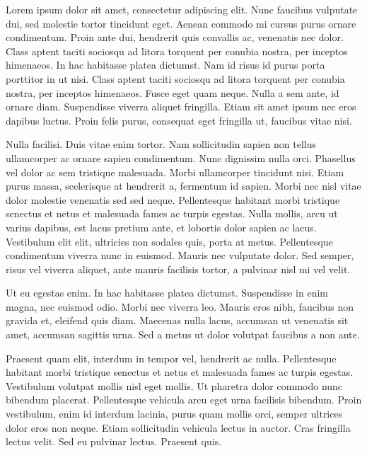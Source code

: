 Lorem ipsum dolor sit amet, consectetur adipiscing elit. Nunc faucibus vulputate dui, sed molestie tortor tincidunt eget. Aenean commodo mi cursus purus ornare condimentum. Proin ante dui, hendrerit quis convallis ac, venenatis nec dolor. Class aptent taciti sociosqu ad litora torquent per conubia nostra, per inceptos himenaeos. In hac habitasse platea dictumst. Nam id risus id purus porta porttitor in ut nisi. Class aptent taciti sociosqu ad litora torquent per conubia nostra, per inceptos himenaeos. Fusce eget quam neque. Nulla a sem ante, id ornare diam. Suspendisse viverra aliquet fringilla. Etiam sit amet ipsum nec eros dapibus luctus. Proin felis purus, consequat eget fringilla ut, faucibus vitae nisi.

Nulla facilisi. Duis vitae enim tortor. Nam sollicitudin sapien non tellus ullamcorper ac ornare sapien condimentum. Nunc dignissim nulla orci. Phasellus vel dolor ac sem tristique malesuada. Morbi ullamcorper tincidunt nisi. Etiam purus massa, scelerisque at hendrerit a, fermentum id sapien. Morbi nec nisl vitae dolor molestie venenatis sed sed neque. Pellentesque habitant morbi tristique senectus et netus et malesuada fames ac turpis egestas. Nulla mollis, arcu ut varius dapibus, est lacus pretium ante, et lobortis dolor sapien ac lacus. Vestibulum elit elit, ultricies non sodales quis, porta at metus. Pellentesque condimentum viverra nunc in euismod. Mauris nec vulputate dolor. Sed semper, risus vel viverra aliquet, ante mauris facilisis tortor, a pulvinar nisl mi vel velit.

Ut eu egestas enim. In hac habitasse platea dictumst. Suspendisse in enim magna, nec euismod odio. Morbi nec viverra leo. Mauris eros nibh, faucibus non gravida et, eleifend quis diam. Maecenas nulla lacus, accumsan ut venenatis sit amet, accumsan sagittis urna. Sed a metus ut dolor volutpat faucibus a non ante.

Praesent quam elit, interdum in tempor vel, hendrerit ac nulla. Pellentesque habitant morbi tristique senectus et netus et malesuada fames ac turpis egestas. Vestibulum volutpat mollis nisl eget mollis. Ut pharetra dolor commodo nunc bibendum placerat. Pellentesque vehicula arcu eget urna facilisis bibendum. Proin vestibulum, enim id interdum lacinia, purus quam mollis orci, semper ultrices dolor eros non neque. Etiam sollicitudin vehicula lectus in auctor. Cras fringilla lectus velit. Sed eu pulvinar lectus. Praesent quis.